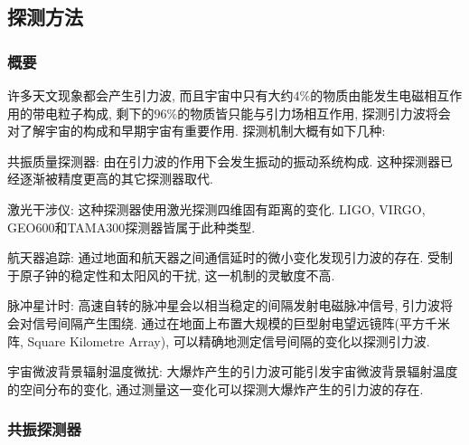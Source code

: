 \documentclass[hidelinks]{ctexart}
\begin{document}


\subsection{探测方法} %
\label{sub:探测方法}

\subsubsection{概要} %
\label{ssub:概要}

许多天文现象都会产生引力波, 而且宇宙中只有大约$4\%$的物质由能发生电磁相互作用的带电粒子构成, 剩下的$96\%$的物质皆只能与引力场相互作用, 探测引力波将会对了解宇宙的构成和早期宇宙有重要作用. 探测机制大概有如下几种:
\begin{cenum}
    \item 共振质量探测器: 由在引力波的作用下会发生振动的振动系统构成. 这种探测器已经逐渐被精度更高的其它探测器取代.
    \item 激光干涉仪: 这种探测器使用激光探测四维固有距离的变化. LIGO, VIRGO, GEO600和TAMA300探测器皆属于此种类型.
    \item 航天器追踪: 通过地面和航天器之间通信延时的微小变化发现引力波的存在. 受制于原子钟的稳定性和太阳风的干扰, 这一机制的灵敏度不高.
    \item 脉冲星计时: 高速自转的脉冲星会以相当稳定的间隔发射电磁脉冲信号, 引力波将会对信号间隔产生围绕. 通过在地面上布置大规模的巨型射电望远镜阵(平方千米阵, Square Kilometre Array), 可以精确地测定信号间隔的变化以探测引力波.
    \item 宇宙微波背景辐射温度微扰: 大爆炸产生的引力波可能引发宇宙微波背景辐射温度的空间分布的变化, 通过测量这一变化可以探测大爆炸产生的引力波的存在.
\end{cenum}


\subsubsection{共振探测器} %
\label{ssub:共振探测器}
\end{document}
